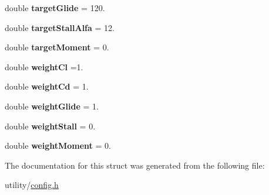 \begin{DoxyCompactItemize}
\item 
\hypertarget{struct_config_1_1_optimizer_params_1_1_fitness_a2c546c543c4b37f14ccb2212f5ccb106}{}\label{struct_config_1_1_optimizer_params_1_1_fitness_a2c546c543c4b37f14ccb2212f5ccb106} 
double {\bfseries target\+Glide} = 120.
\item 
\hypertarget{struct_config_1_1_optimizer_params_1_1_fitness_af9ae034f5b96580c4d6d56885b120472}{}\label{struct_config_1_1_optimizer_params_1_1_fitness_af9ae034f5b96580c4d6d56885b120472} 
double {\bfseries target\+Stall\+Alfa} = 12.
\item 
\hypertarget{struct_config_1_1_optimizer_params_1_1_fitness_aca32b706fb91fd4283e50d2b0bd5c077}{}\label{struct_config_1_1_optimizer_params_1_1_fitness_aca32b706fb91fd4283e50d2b0bd5c077} 
double {\bfseries target\+Moment} = 0.
\item 
\hypertarget{struct_config_1_1_optimizer_params_1_1_fitness_a131f6e3214620d90b03e16be286aad56}{}\label{struct_config_1_1_optimizer_params_1_1_fitness_a131f6e3214620d90b03e16be286aad56} 
double {\bfseries weight\+Cl} =1.
\item 
\hypertarget{struct_config_1_1_optimizer_params_1_1_fitness_ad515ada424e92bd3f963fdcd4c63ba03}{}\label{struct_config_1_1_optimizer_params_1_1_fitness_ad515ada424e92bd3f963fdcd4c63ba03} 
double {\bfseries weight\+Cd} = 1.
\item 
\hypertarget{struct_config_1_1_optimizer_params_1_1_fitness_aef5f76da9704838a2caf0c4a9ae712b1}{}\label{struct_config_1_1_optimizer_params_1_1_fitness_aef5f76da9704838a2caf0c4a9ae712b1} 
double {\bfseries weight\+Glide} = 1.
\item 
\hypertarget{struct_config_1_1_optimizer_params_1_1_fitness_ad9ffb0836c80c0ddcb483c661fc6f42a}{}\label{struct_config_1_1_optimizer_params_1_1_fitness_ad9ffb0836c80c0ddcb483c661fc6f42a} 
double {\bfseries weight\+Stall} = 0.
\item 
\hypertarget{struct_config_1_1_optimizer_params_1_1_fitness_ae348e127a5fe28e28b8cbe7cb0aea68f}{}\label{struct_config_1_1_optimizer_params_1_1_fitness_ae348e127a5fe28e28b8cbe7cb0aea68f} 
double {\bfseries weight\+Moment} = 0.
\end{DoxyCompactItemize}


The documentation for this struct was generated from the following file\+:\begin{DoxyCompactItemize}
\item 
utility/\hyperlink{config_8h}{config.\+h}\end{DoxyCompactItemize}
